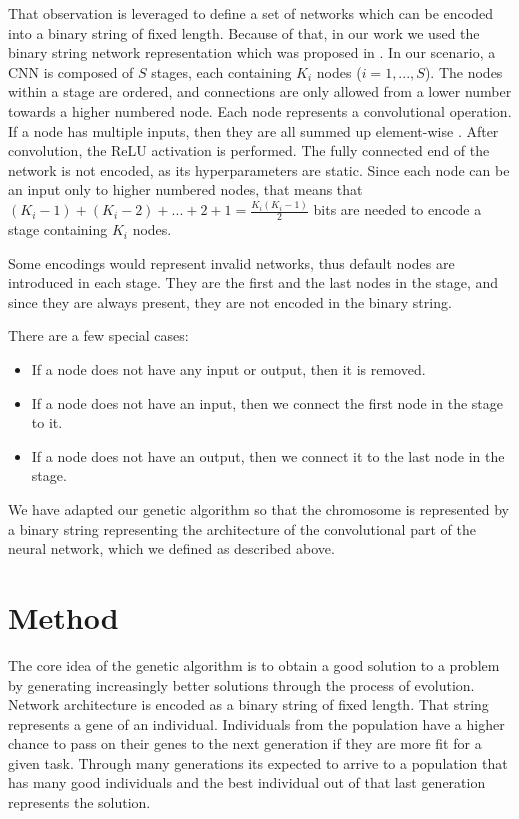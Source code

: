 \documentclass[eng]{simposium}
\begin{document}
That observation is leveraged to define a set of networks which  
can be encoded into a binary string of fixed length.  
Because of that, in our work we used the binary string network representation which was proposed in \cite{4}.  
In our scenario, a CNN is composed of $S$ stages, each containing  
$K_i$ nodes ($i=1,...,S$).  
The nodes within a stage are ordered, and connections are only allowed from a lower number towards a higher numbered node. 
Each node represents a convolutional operation. If a node has multiple inputs, then they are all summed up element-wise \cite{4}. 
After convolution, the ReLU activation is performed.  
The fully connected end of the network is not encoded, as its hyperparameters are static.  
Since each node can be an input only to higher numbered nodes, that means that  
$(K_i -1) + (K_i - 2) + ... + 2 + 1 = \frac{K_i(K_i-1)}{2}$ bits are needed to encode a stage containing $K_i$ nodes. 

Some encodings would represent invalid networks, thus default nodes are introduced in each stage. 
They are the first and the last nodes in the stage, and since they are always present, they are not encoded in the binary string. 

There are a few special cases: 
\begin{itemize} 
    \item If a node does not have any input or output, then it is removed. 
    \item If a node does not have an input, then we connect the first node in the stage to it. 
    \item If a node does not have an output, then we connect it to the last node in the stage. 
\end{itemize} 

We have adapted our genetic algorithm so that the chromosome is represented by a binary string representing  
the architecture of the convolutional part of the neural network, which we defined as described above.  

\section{Method} 
  
The core idea of the genetic algorithm is to obtain a good solution to a problem by generating increasingly better solutions through the process of evolution. 
Network architecture is encoded as a binary string of fixed length. That string represents a gene of an individual. 
Individuals from the population have a higher chance to pass on their genes to the next generation if they are more fit for a given task. 
Through many generations its expected to arrive to a population that has many good individuals and the best individual out of that last generation represents the solution. 
\end{document}
